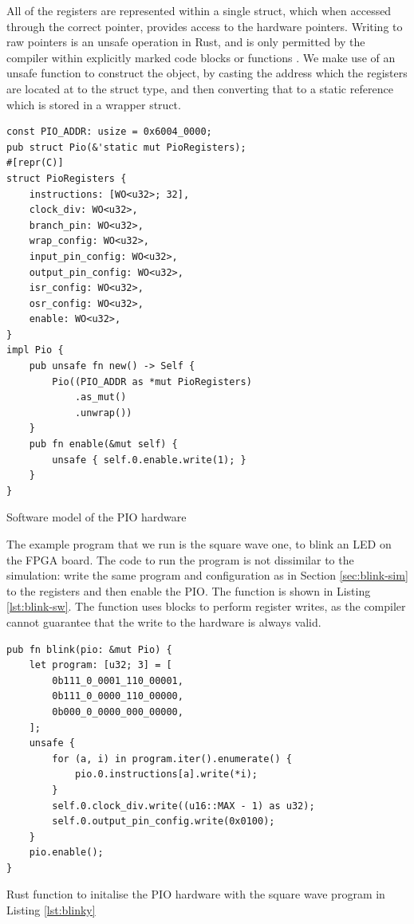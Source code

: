 All of the registers are represented within a single struct, which when accessed through the correct pointer, provides access to the hardware pointers. Writing to raw pointers is an unsafe operation in Rust, and is only permitted by the compiler within explicitly marked  code blocks or functions \cite{rust-usability}. We make use of an unsafe function to construct the  object, by casting the address which the registers are located at to the struct type, and then converting that to a static reference which is stored in a wrapper struct.

\begin{listing}[h!]
    \begin{verbatim}
const PIO_ADDR: usize = 0x6004_0000;
pub struct Pio(&'static mut PioRegisters);
#[repr(C)]
struct PioRegisters {
    instructions: [WO<u32>; 32],
    clock_div: WO<u32>,
    branch_pin: WO<u32>,
    wrap_config: WO<u32>,
    input_pin_config: WO<u32>,
    output_pin_config: WO<u32>,
    isr_config: WO<u32>,
    osr_config: WO<u32>,
    enable: WO<u32>,
}
impl Pio {
    pub unsafe fn new() -> Self {
        Pio((PIO_ADDR as *mut PioRegisters)
            .as_mut()
            .unwrap())
    }
    pub fn enable(&mut self) {
        unsafe { self.0.enable.write(1); }
    }
}
    \end{verbatim}
    \caption{Software model of the PIO hardware}
    \label{lst:pio-rs}
\end{listing}

The example program that we run is the square wave one, to blink an LED on the FPGA board. The code to run the program is not dissimilar to the simulation: write the same program and configuration as in Section \ref{sec:blink-sim} to the registers and then enable the PIO. The function is shown in Listing \ref{lst:blink-sw}. The function uses  blocks to perform register writes, as the compiler cannot guarantee that the write to the hardware is always valid.

\begin{listing}[h!]
    \begin{verbatim}
pub fn blink(pio: &mut Pio) {
    let program: [u32; 3] = [
        0b111_0_0001_110_00001,
        0b111_0_0000_110_00000,
        0b000_0_0000_000_00000,
    ];
    unsafe {
        for (a, i) in program.iter().enumerate() {
            pio.0.instructions[a].write(*i);
        }
        self.0.clock_div.write((u16::MAX - 1) as u32);
        self.0.output_pin_config.write(0x0100);
    }
    pio.enable();
}
    \end{verbatim}
    \caption{Rust function to initalise the PIO hardware with the square wave program in Listing \ref{lst:blinky}}
    \label{lst:blink-sw}
\end{listing}

